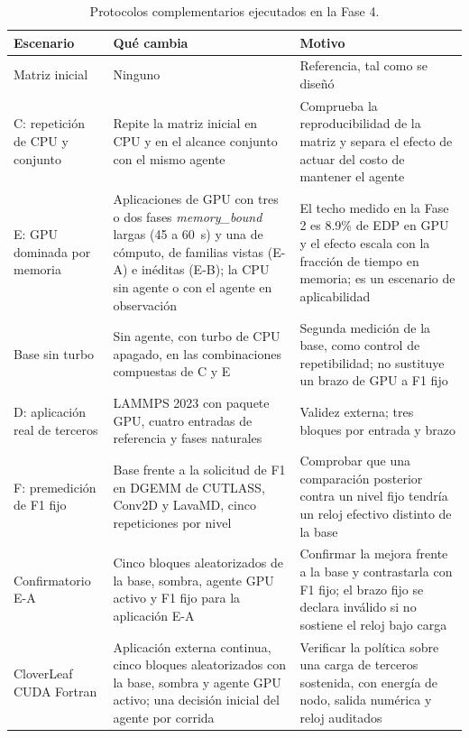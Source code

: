 \begin{table}[!t]
\centering
\caption{Protocolos complementarios ejecutados en la Fase 4.}
\label{tab:fase4-escenarios}
\footnotesize
\renewcommand{\arraystretch}{0.88}
\setlength{\tabcolsep}{3pt}
\begin{tabular}{@{}>{\raggedright\arraybackslash}p{2.7cm}>{\raggedright\arraybackslash}p{4.5cm}>{\raggedright\arraybackslash}p{5.3cm}@{}}
\toprule
\textbf{Escenario} & \textbf{Qué cambia} & \textbf{Motivo} \\
\midrule
Matriz inicial & Ninguno & Referencia, tal como se diseñó \\
C: repetición de CPU y conjunto & Repite la matriz inicial en CPU y en el alcance conjunto con el mismo agente & Comprueba la reproducibilidad de la matriz y separa el efecto de actuar del costo de mantener el agente \\
E: GPU dominada por memoria & Aplicaciones de GPU con tres o dos fases \textit{memory\_bound} largas (45 a 60~s) y una de cómputo, de familias vistas (E-A) e inéditas (E-B); la CPU sin agente o con el agente en observación & El techo medido en la Fase 2 es 8.9\% de EDP en GPU y el efecto escala con la fracción de tiempo en memoria; es un escenario de aplicabilidad \\
Base sin turbo & Sin agente, con turbo de CPU apagado, en las combinaciones compuestas de C y E & Segunda medición de la base, como control de repetibilidad; no sustituye un brazo de GPU a F1 fijo \\
D: aplicación real de terceros & LAMMPS 2023 con paquete GPU, cuatro entradas de referencia y fases naturales & Validez externa; tres bloques por entrada y brazo \\
F: premedición de F1 fijo & Base frente a la solicitud de F1 en DGEMM de CUTLASS, Conv2D y LavaMD, cinco repeticiones por nivel & Comprobar que una comparación posterior contra un nivel fijo tendría un reloj efectivo distinto de la base \\
Confirmatorio E-A & Cinco bloques aleatorizados de la base, sombra, agente GPU activo y F1 fijo para la aplicación E-A & Confirmar la mejora frente a la base y contrastarla con F1 fijo; el brazo fijo se declara inválido si no sostiene el reloj bajo carga \\
CloverLeaf CUDA Fortran & Aplicación externa continua, cinco bloques aleatorizados con la base, sombra y agente GPU activo; una decisión inicial del agente por corrida & Verificar la política sobre una carga de terceros sostenida, con energía de nodo, salida numérica y reloj auditados \\
\bottomrule
\end{tabular}
\end{table}
